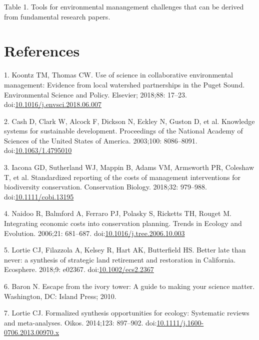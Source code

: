 \documentclass[10pt,letterpaper]{article}
\begin{document}
Table 1. Tools for environmental manangement challenges that can be
derived from fundamental research papers.

\section*{References}\label{references}

\hypertarget{refs}{}
\hypertarget{ref-Koontz2018}{}
1. Koontz TM, Thomas CW. Use of science in collaborative environmental
management: Evidence from local watershed partnerships in the Puget
Sound. Environmental Science and Policy. Elsevier; 2018;88: 17--23.
doi:\href{https://doi.org/10.1016/j.envsci.2018.06.007}{10.1016/j.envsci.2018.06.007}

\hypertarget{ref-Cash2003}{}
2. Cash D, Clark W, Alcock F, Dickson N, Eckley N, Guston D, et al.
Knowledge systems for sustainable development. Proceedings of the
National Academy of Sciences of the United States of America. 2003;100:
8086--8091.
doi:\href{https://doi.org/10.1063/1.4795010}{10.1063/1.4795010}

\hypertarget{ref-Iacona2018}{}
3. Iacona GD, Sutherland WJ, Mappin B, Adams VM, Armsworth PR, Coleshaw
T, et al. Standardized reporting of the costs of management
interventions for biodiversity conservation. Conservation Biology.
2018;32: 979--988.
doi:\href{https://doi.org/10.1111/cobi.13195}{10.1111/cobi.13195}

\hypertarget{ref-Naidoo2006}{}
4. Naidoo R, Balmford A, Ferraro PJ, Polasky S, Ricketts TH, Rouget M.
Integrating economic costs into conservation planning. Trends in Ecology
and Evolution. 2006;21: 681--687.
doi:\href{https://doi.org/10.1016/j.tree.2006.10.003}{10.1016/j.tree.2006.10.003}

\hypertarget{ref-Lortie2018}{}
5. Lortie CJ, Filazzola A, Kelsey R, Hart AK, Butterfield HS. Better
late than never: a synthesis of strategic land retirement and
restoration in California. Ecosphere. 2018;9: e02367.
doi:\href{https://doi.org/10.1002/ecs2.2367}{10.1002/ecs2.2367}

\hypertarget{ref-Baron2010}{}
6. Baron N. Escape from the ivory tower: A guide to making your science
matter. Washington, DC: Island Press; 2010.

\hypertarget{ref-Lortie2014}{}
7. Lortie CJ. Formalized synthesis opportunities for ecology: Systematic
reviews and meta-analyses. Oikos. 2014;123: 897--902.
doi:\href{https://doi.org/10.1111/j.1600-0706.2013.00970.x}{10.1111/j.1600-0706.2013.00970.x}
\end{document}
